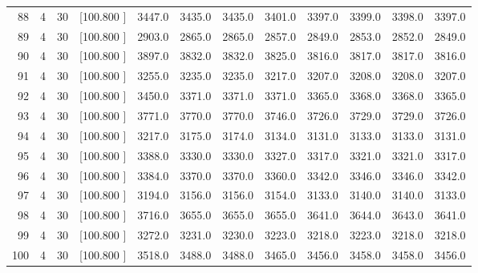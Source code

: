 \documentclass[12pt,a4paper]{article}
\begin{document}
\begin{center}
{\begin{tabular}{r r r r r r r r r r r r}
  88&  4& 30&[100.800   ]&  3447.0&  3435.0&  3435.0&  3401.0&  3397.0&  3399.0&  3398.0&  3397.0\\[-0.02in]
  89&  4& 30&[100.800   ]&  2903.0&  2865.0&  2865.0&  2857.0&  2849.0&  2853.0&  2852.0&  2849.0\\[-0.02in]
  90&  4& 30&[100.800   ]&  3897.0&  3832.0&  3832.0&  3825.0&  3816.0&  3817.0&  3817.0&  3816.0\\[-0.02in]
  91&  4& 30&[100.800   ]&  3255.0&  3235.0&  3235.0&  3217.0&  3207.0&  3208.0&  3208.0&  3207.0\\[-0.02in]
  92&  4& 30&[100.800   ]&  3450.0&  3371.0&  3371.0&  3371.0&  3365.0&  3368.0&  3368.0&  3365.0\\[-0.02in]
  93&  4& 30&[100.800   ]&  3771.0&  3770.0&  3770.0&  3746.0&  3726.0&  3729.0&  3729.0&  3726.0\\[-0.02in]
  94&  4& 30&[100.800   ]&  3217.0&  3175.0&  3174.0&  3134.0&  3131.0&  3133.0&  3133.0&  3131.0\\[-0.02in]
  95&  4& 30&[100.800   ]&  3388.0&  3330.0&  3330.0&  3327.0&  3317.0&  3321.0&  3321.0&  3317.0\\[-0.02in]
  96&  4& 30&[100.800   ]&  3384.0&  3370.0&  3370.0&  3360.0&  3342.0&  3346.0&  3346.0&  3342.0\\[-0.02in]
  97&  4& 30&[100.800   ]&  3194.0&  3156.0&  3156.0&  3154.0&  3133.0&  3140.0&  3140.0&  3133.0\\[-0.02in]
  98&  4& 30&[100.800   ]&  3716.0&  3655.0&  3655.0&  3655.0&  3641.0&  3644.0&  3643.0&  3641.0\\[-0.02in]
  99&  4& 30&[100.800   ]&  3272.0&  3231.0&  3230.0&  3223.0&  3218.0&  3223.0&  3218.0&  3218.0\\[-0.02in]
 100&  4& 30&[100.800   ]&  3518.0&  3488.0&  3488.0&  3465.0&  3456.0&  3458.0&  3458.0&  3456.0\\[-0.02in]

\hline
\end{tabular}}
\end{center}
\newpage
\end{document}
